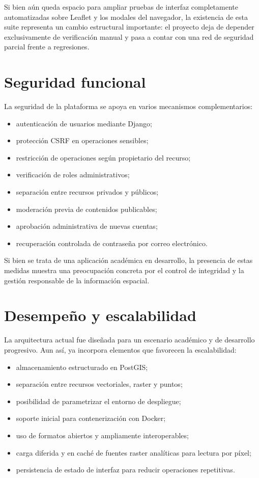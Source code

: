 \documentclass[12pt,a4paper]{report}
\begin{document}
Si bien a\'un queda espacio para ampliar pruebas de interfaz completamente automatizadas sobre Leaflet y los modales del navegador, la existencia de esta suite representa un cambio estructural importante: el proyecto deja de depender exclusivamente de verificaci\'on manual y pasa a contar con una red de seguridad parcial frente a regresiones.

\section{Seguridad funcional}

La seguridad de la plataforma se apoya en varios mecanismos complementarios:

\begin{itemize}
    \item autenticaci\'on de usuarios mediante Django;
    \item protecci\'on CSRF en operaciones sensibles;
    \item restricci\'on de operaciones seg\'un propietario del recurso;
    \item verificaci\'on de roles administrativos;
    \item separaci\'on entre recursos privados y p\'ublicos;
    \item moderaci\'on previa de contenidos publicables;
    \item aprobaci\'on administrativa de nuevas cuentas;
    \item recuperaci\'on controlada de contrase\~na por correo electr\'onico.
\end{itemize}

Si bien se trata de una aplicaci\'on acad\'emica en desarrollo, la presencia de estas medidas muestra una preocupaci\'on concreta por el control de integridad y la gesti\'on responsable de la informaci\'on espacial.

\section{Desempe\~no y escalabilidad}

La arquitectura actual fue dise\~nada para un escenario acad\'emico y de desarrollo progresivo. Aun as\'i, ya incorpora elementos que favorecen la escalabilidad:

\begin{itemize}
    \item almacenamiento estructurado en PostGIS;
    \item separaci\'on entre recursos vectoriales, raster y puntos;
    \item posibilidad de parametrizar el entorno de despliegue;
    \item soporte inicial para contenerizaci\'on con Docker;
    \item uso de formatos abiertos y ampliamente interoperables;
    \item carga diferida y en cach\'e de fuentes raster anal\'iticas para lectura por p\'ixel;
    \item persistencia de estado de interfaz para reducir operaciones repetitivas.
\end{itemize}
\end{document}
